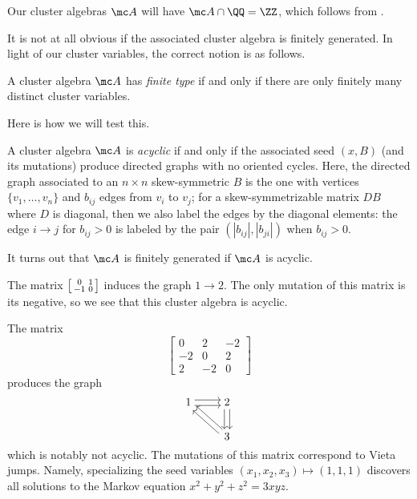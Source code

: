 \documentclass[../notes.tex]{subfiles}
\begin{document}
\begin{remark}
	Our cluster algebras $\mc A$ will have $\mc A\cap\QQ=\ZZ$, which follows from .
\end{remark}
It is not at all obvious if the associated cluster algebra is finitely generated. In light of our cluster variables, the correct notion is as follows.
\begin{definition}
	A cluster algebra $\mc A$ has \textit{finite type} if and only if there are only finitely many distinct cluster variables.
\end{definition}
Here is how we will test this.
\begin{definition}
	A cluster algebra $\mc A$ is \textit{acyclic} if and only if the associated seed $(x,B)$ (and its mutations) produce directed graphs with no oriented cycles. Here, the directed graph associated to an $n\times n$ skew-symmetric $B$ is the one with vertices $\{v_1,\ldots,v_n\}$ and $b_{ij}$ edges from $v_i$ to $v_j$; for a skew-symmetrizable matrix $DB$ where $D$ is diagonal, then we also label the edges by the diagonal elements: the edge $i\to j$ for $b_{ij}>0$ is labeled by the pair $(\left|b_{ij}\right|,\left|b_{ji}\right|)$ when $b_{ij}>0$.
\end{definition}
\begin{remark}
	It turns out that $\mc A$ is finitely generated if $\mc A$ is acyclic.
\end{remark}
\begin{example}
	The matrix $\begin{bsmallmatrix}
		0 & 1 \\ -1 & 0
	\end{bsmallmatrix}$ induces the graph $1\to 2$. The only mutation of this matrix is its negative, so we see that this cluster algebra is acyclic.
\end{example}
\begin{nex}
	The matrix
	\[\begin{bmatrix}
		0 & 2 & -2 \\ -2 & 0 & 2 \\ 2 & -2 & 0
	\end{bmatrix}\]
	produces the graph
	\[\begin{tikzcd}[cramped]
		1 & 2 \\
		& 3
		\arrow[shift right, from=1-1, to=1-2]
		\arrow[shift left, from=1-1, to=1-2]
		\arrow[shift right, from=1-2, to=2-2]
		\arrow[shift left, from=1-2, to=2-2]
		\arrow[shift right, from=2-2, to=1-1]
		\arrow[shift left, from=2-2, to=1-1]
	\end{tikzcd}\]
	which is notably not acyclic. The mutations of this matrix correspond to Vieta jumps. Namely, specializing the seed variables $(x_1,x_2,x_3)\mapsto(1,1,1)$ discovers all solutions to the Markov equation $x^2+y^2+z^2=3xyz$.
\end{nex}
\end{document}
